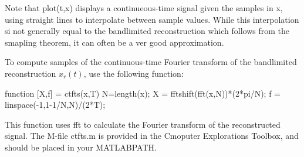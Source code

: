 Note that plot(t,x) displays a continueous-time signal given the samples in x, using straight lines to interpolate between sample values. While this interpolation si not generally equal to the bandlimited reconstruction which follows from the smapling theorem, it can often be a ver good approximation.

To compute samples of the continuous-time Fourier transform of the bandlimited reconstruction $x_r(t)$, use the following function:

function [X,f] = ctfts(x,T)
N=length(x);
X = fftshift(fft(x,N))*(2*pi/N);
f = linspace(-1,1-1/N,N)/(2*T);

This function uses fft to calculate the Fourier transform of the reconstructed signal. The M-file ctfts.m is provided in the Cmoputer Explorations Toolbox, and should be placed in your MATLABPATH.
